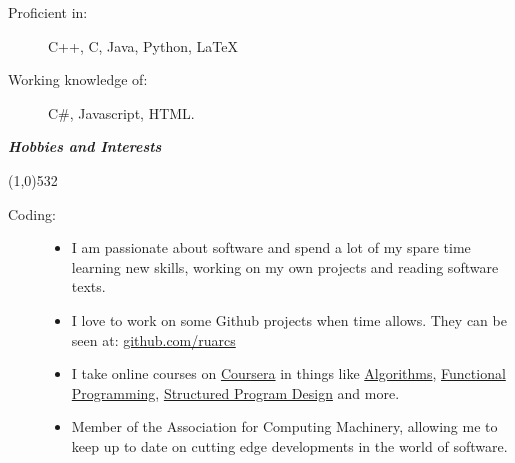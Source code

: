 \documentclass[a4,11pt]{article}
\newcommand{\resitem}[1]{\item #1 \vspace{-0pt}}
\newcommand{\resheading}[1]{\large \colorbox{mycolour}{\begin{minipage}{\textwidth}{\textbf{#1 \vphantom{p\^{E}}}}\end{minipage}}}
\begin{document}
\begin{description}
\item[Proficient in:]
C++, C,  Java, Python, \LaTeX%
\item[Working knowledge of:]
C\#, Javascript, HTML.
\end{description}

\vspace{8pt}

\resheading{\textit{Hobbies and Interests}\vspace{-5mm}}
 \line(1,0){532}
  \vspace{-3mm}

\begin{description}
\item[Coding:] \hfill
\vspace{-2mm}
\begin{itemize}
\resitem[$\--$]{I am passionate about software and spend a lot of my spare time learning new skills,  working on my own projects and reading software texts.}
\resitem[$\--$]{I love to work on some Github projects when time allows. They can be seen at: \href{http://github.com/ruarcs}{github.com/ruarcs}}
\resitem[$\--$]{I take online courses on \href{coursera.org}{Coursera} in things like \href{https://www.coursera.org/course/algs4partI}{Algorithms}, \href{https://www.coursera.org/course/progfun}{Functional Programming}, \href{https://www.coursera.org/course/programdesign}{Structured Program Design} and more.}
\resitem[$\--$]{Member of the Association for Computing Machinery, allowing me to keep up to date on cutting edge developments in the world of software.}
\end{itemize}


\end{description}
\end{document}
